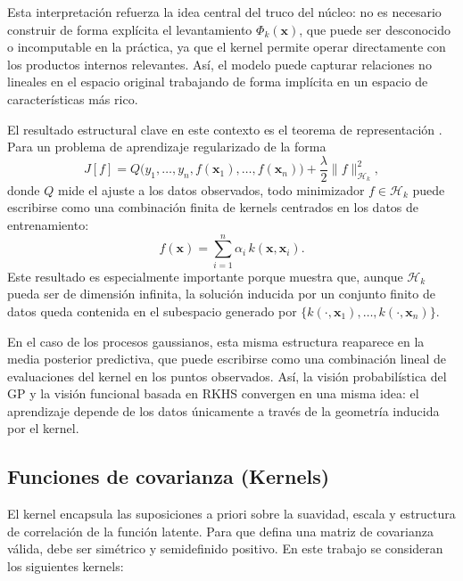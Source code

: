 Esta interpretación refuerza la idea central del truco del núcleo: no es necesario construir
de forma explícita el levantamiento \(\Phi_k(\bm{x})\), que puede ser desconocido o
incomputable en la práctica, ya que el kernel permite operar directamente con los productos
internos relevantes. Así, el modelo puede capturar relaciones no lineales en el espacio
original trabajando de forma implícita en un espacio de características más rico.

El resultado estructural clave en este contexto es el teorema de representación \cite{scholkopf2001generalized}. Para un
problema de aprendizaje regularizado de la forma
\[
J[f]=Q\bigl(y_1,\dots,y_n,f(\bm{x}_1),\dots,f(\bm{x}_n)\bigr)
+\frac{\lambda}{2}\|f\|_{\mathcal{H}_k}^2,
\]
donde \(Q\) mide el ajuste a los datos observados, todo minimizador \(f\in
\mathcal{H}_k\) puede escribirse como una combinación finita de kernels centrados en los
datos de entrenamiento:
\[
f(\bm{x})=\sum_{i=1}^n \alpha_i\,k(\bm{x},\bm{x}_i).
\]
Este resultado es especialmente importante porque muestra que, aunque \(\mathcal{H}_k\)
pueda ser de dimensión infinita, la solución inducida por un conjunto finito de datos queda
contenida en el subespacio generado por
\(
\{k(\cdot,\bm{x}_1),\dots,k(\cdot,\bm{x}_n)\}.
\)

En el caso de los procesos gaussianos, esta misma estructura reaparece en la media posterior
predictiva, que puede escribirse como una combinación lineal de evaluaciones del kernel en
los puntos observados. Así, la visión probabilística del GP y la visión funcional basada en
RKHS convergen en una misma idea: el aprendizaje depende de los datos únicamente a
través de la geometría inducida por el kernel.

\subsection{Funciones de covarianza (Kernels)}
\label{subsec:gp_kernel}

El kernel encapsula las suposiciones a priori sobre la suavidad, escala y estructura de
correlación de la función latente. Para que defina una matriz de covarianza válida, debe ser
simétrico y semidefinido positivo. En este trabajo se consideran los siguientes kernels:

